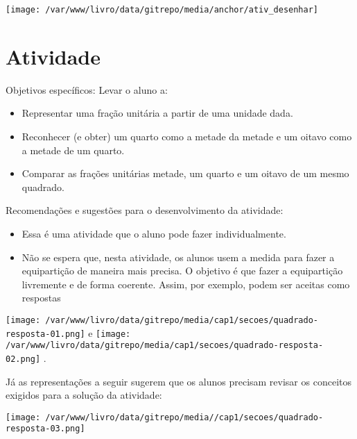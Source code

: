 \documentclass[a4paper,12pt,twoside]{book}
\begin{document}
\texttt{[image: /var/www/livro/data/gitrepo/media/anchor/ativ\_desenhar]}
\section{Atividade}




\begin{professor*}[breakable]{}{}  
  
  Objetivos específicos: Levar o aluno a:  
\begin{itemize} %
    \item       Representar uma fração unitária a partir de uma unidade dada.  
    \item       Reconhecer (e obter) um quarto como a metade da metade e um oitavo como a metade de um quarto.
    \item       Comparar as frações unitárias metade, um quarto e um oitavo de um mesmo quadrado.
\end{itemize} %
  
  
  Recomendações e sugestões para o desenvolvimento da atividade:  
\begin{itemize} %
    \item       Essa é uma atividade que o aluno pode fazer individualmente. 
    \item       Não se espera que, nesta atividade, os alunos usem a medida para fazer a equipartição de maneira mais precisa. O objetivo é que fazer a equipartição livremente e de forma coerente. Assim, por exemplo, podem ser aceitas como respostas
\end{itemize} %
  
  
    \texttt{[image: /var/www/livro/data/gitrepo/media/cap1/secoes/quadrado-resposta-01.png]}   e     \texttt{[image: /var/www/livro/data/gitrepo/media/cap1/secoes/quadrado-resposta-02.png]}  .  
  
  Já as representações a seguir sugerem que os alunos precisam revisar os conceitos exigidos para a solução da atividade:  
  
    \texttt{[image: /var/www/livro/data/gitrepo/media//cap1/secoes/quadrado-resposta-03.png]}  
  

\end{professor*}
\end{document}
